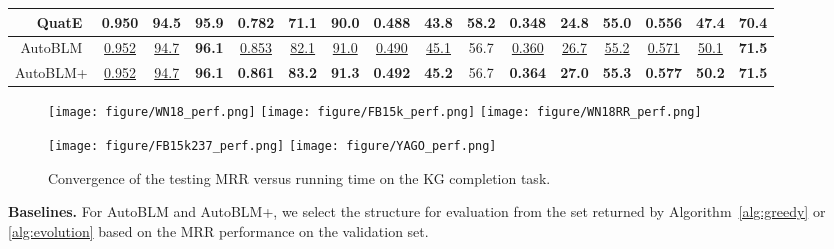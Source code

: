 \documentclass[10pt,journal,compsoc]{IEEEtran}
\newcommand{\parabegin}[1]{\vspace{3px}\noindent\textbf{#1}}
\begin{document}
\begin{table*}[ht]
\begin{tabular}{cc|ccc|ccc|ccc|ccc|ccc}
		&    QuatE      &       0.950       &       94.5       &       95.9       &       0.782       &       71.1       &       90.0       & {0.488} &       43.8       &  \textbf{58.2}   &       0.348       &       24.8       &       55.0       &        0.556       &       47.4        &       70.4        \\  \midrule
		\multicolumn{2}{c|}{AutoBLM}           & \underline{0.952} & \underline{94.7} &  \textbf{96.1}   &  \underline{0.853}   &  \underline{82.1}   &  \underline{91.0}   &  \underline{0.490}   &  \underline{45.1}   & {56.7} &  \underline{0.360}   &  \underline{26.7}   &  \underline{55.2}   &  \underline{0.571}   &  \underline{50.1}   &  \textbf{71.5}   \\ 
		\multicolumn{2}{c|}{AutoBLM+}       &     \underline{0.952}   &    \underline{94.7}     &    \textbf{96.1}     &    \textbf{0.861}  &  \textbf{83.2}  &   \textbf{91.3}   &  \textbf{0.492}       & 	\textbf{45.2}	   &  	{56.7}	   &  	\textbf{0.364}	   &    \textbf{27.0}	 &   	\textbf{55.3}   &  \textbf{0.577}  &   \textbf{50.2}    &  \textbf{71.5}  \\ \bottomrule
	\end{tabular}
\vspace{-5px}
\end{table*}


\begin{figure*}[ht]
	\centering
{\texttt{[image: figure/WN18\_perf.png]}}\qquad
{\texttt{[image: figure/FB15k\_perf.png]}}\qquad
{\texttt{[image: figure/WN18RR\_perf.png]}}
	
{\texttt{[image: figure/FB15k237\_perf.png]}}\qquad
{\texttt{[image: figure/YAGO\_perf.png]}}
	
	\vspace{-10px}
	\caption{Convergence of the testing MRR versus running time 
		on the KG completion task.}
	\vspace{-10px}
	\label{fig:curve}
\end{figure*}




\parabegin{Baselines.}
For AutoBLM and AutoBLM+, 
we 
select the structure for evaluation 
from the set returned by 
Algorithm~\ref{alg:greedy}
or \ref{alg:evolution}
based on the 
MRR performance on
the validation set.
\end{document}

